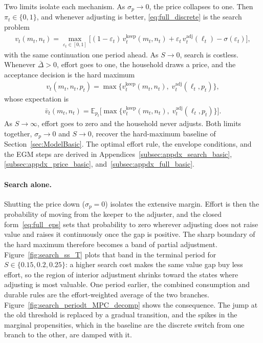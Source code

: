Two limits isolate each mechanism. As $\sigma_p\to 0$, the price collapses to one. Then $\pi_t\in\{0,1\}$, and whenever adjusting is better, \eqref{eq:full_discrete} is the search problem
\begin{align}
	v_t(m_t,n_t) = \max_{\varepsilon_t \in [0,1]} \Big[(1-\varepsilon_t)\, v_t^{\text{keep}}(m_t,n_t) + \varepsilon_t\, v_t^{\text{adj}}(\ell_t) - \sigma(\varepsilon_t)\Big], \label{eq:search_discrete_basic}
\end{align}
with the same continuation one period ahead. As $S\to 0$, search is costless. Whenever $\bar\Delta>0$, effort goes to one, the household draws a price, and the acceptance decision is the hard maximum
\begin{align}
	v_t(m_t,n_t,p_t) = \max\Big\{ v_t^{\text{keep}}(m_t,n_t),\; v_t^{\text{adj}}(\ell_t,p_t)\Big\}, \label{eq:price_discrete}
\end{align}
whose expectation is
\begin{align}
	\bar v_t(m_t,n_t)
	= \mathbb{E}_{p_t}\Big[\max\big\{ v_t^{\text{keep}}(m_t,n_t),\; v_t^{\text{adj}}(\ell_t,p_t) \big\}\Big]. \label{eq:price_barv}
\end{align}
As $S\to\infty$, effort goes to zero and the household never adjusts. Both limits together, $\sigma_p\to 0$ and $S\to 0$, recover the hard-maximum baseline of Section~\ref{sec:ModelBasic}. The optimal effort rule, the envelope conditions, and the EGM steps are derived in Appendices~\ref{subsec:appdx_search_basic}, \ref{subsec:appdx_price_basic}, and~\ref{subsec:appdx_full_basic}.

\paragraph{Search alone.}
Shutting the price down ($\sigma_p = 0$) isolates the extensive margin. Effort is then the probability of moving from the keeper to the adjuster, and the closed form~\eqref{eq:full_eps} sets that probability to zero wherever adjusting does not raise value and raises it continuously once the gap is positive. The sharp boundary of the hard maximum therefore becomes a band of partial adjustment. Figure~\ref{fig:search_ss_T} plots that band in the terminal period for $S\in\{0.15,0.2,0.25\}$: a higher search cost makes the same value gap buy less effort, so the region of interior adjustment shrinks toward the states where adjusting is most valuable. One period earlier, the combined consumption and durable rules are the effort-weighted average of the two branches. Figure~\ref{fig:search_periodt_MPC_decomp} shows the consequence. The jump at the old threshold is replaced by a gradual transition, and the spikes in the marginal propensities, which in the baseline are the discrete switch from one branch to the other, are damped with it.

